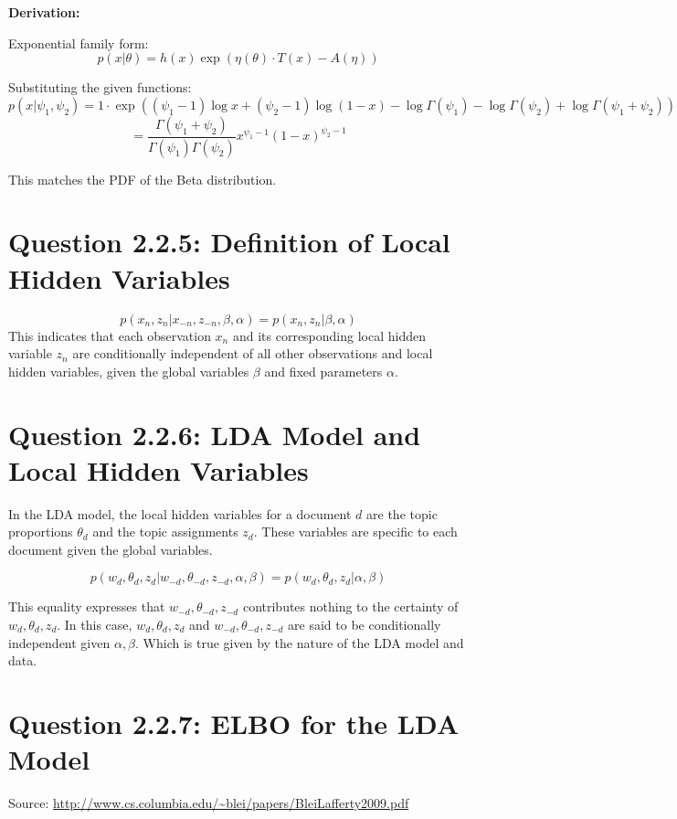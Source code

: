 \documentclass{article}
\begin{document}
\textbf{Derivation:}

Exponential family form:
\[
p(x|\theta) = h(x) \exp(\eta(\theta) \cdot T(x) - A(\eta))
\]

Substituting the given functions:
\[
p(x|\psi_1, \psi_2) = 1 \cdot \exp\left((\psi_1-1) \log x + (\psi_2-1) \log(1-x) - \log \Gamma(\psi_1) - \log \Gamma(\psi_2) + \log \Gamma(\psi_1 + \psi_2)\right)
\]
\[
= \frac{\Gamma(\psi_1 + \psi_2)}{\Gamma(\psi_1)\Gamma(\psi_2)} x^{\psi_1-1} (1-x)^{\psi_2-1}
\]

This matches the PDF of the Beta distribution.

\section*{Question 2.2.5: Definition of Local Hidden Variables}

\[
p(x_n, z_n | x_{-n}, z_{-n}, \beta, \alpha) = p(x_n, z_n | \beta, \alpha)
\]
This indicates that each observation \( x_n \) and its corresponding local hidden variable \( z_n \) are conditionally independent of all other observations and local hidden variables, given the global variables \( \beta \) and fixed parameters \( \alpha \).

\section*{Question 2.2.6: LDA Model and Local Hidden Variables}

In the LDA model, the local hidden variables for a document \(d\) are the topic proportions \(\theta_d\) and the topic assignments \(z_d\). These variables are specific to each document given the global variables.

\[
p(w_d, \theta_d, z_d | w_{-d}, \theta_{-d}, z_{-d}, \alpha, \beta) = p(w_d, \theta_d, z_d | \alpha, \beta)
\]

This equality expresses that \(w_{-d}, \theta_{-d}, z_{-d}\) contributes nothing to the certainty of \(w_d, \theta_d, z_d\). In this case, \(w_d, \theta_d, z_d\) and \(w_{-d}, \theta_{-d}, z_{-d}\) are said to be conditionally independent given \(\alpha, \beta\). Which is true given by the nature of the LDA model and data.

\section*{Question 2.2.7: ELBO for the LDA Model}

Source: \url{http://www.cs.columbia.edu/~blei/papers/BleiLafferty2009.pdf}
\end{document}
